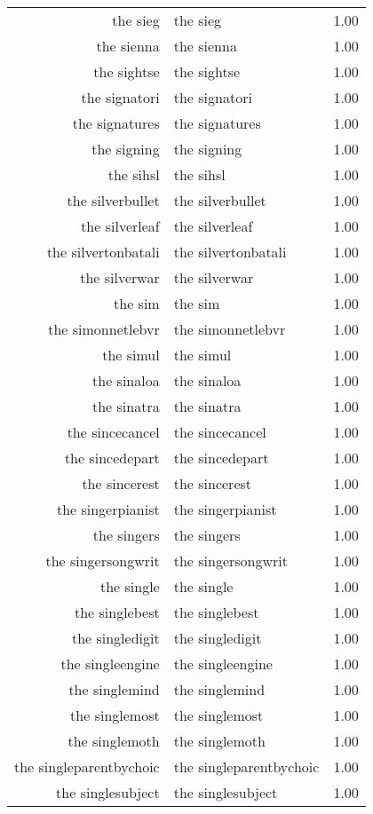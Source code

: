 \begin{table}[ht]
\begin{tabular}{rlr}
  the sieg & the sieg & 1.00 \\ 
  the sienna & the sienna & 1.00 \\ 
  the sightse & the sightse & 1.00 \\ 
  the signatori & the signatori & 1.00 \\ 
  the signatures & the signatures & 1.00 \\ 
  the signing & the signing & 1.00 \\ 
  the sihsl & the sihsl & 1.00 \\ 
  the silverbullet & the silverbullet & 1.00 \\ 
  the silverleaf & the silverleaf & 1.00 \\ 
  the silvertonbatali & the silvertonbatali & 1.00 \\ 
  the silverwar & the silverwar & 1.00 \\ 
  the sim & the sim & 1.00 \\ 
  the simonnetlebvr & the simonnetlebvr & 1.00 \\ 
  the simul & the simul & 1.00 \\ 
  the sinaloa & the sinaloa & 1.00 \\ 
  the sinatra & the sinatra & 1.00 \\ 
  the sincecancel & the sincecancel & 1.00 \\ 
  the sincedepart & the sincedepart & 1.00 \\ 
  the sincerest & the sincerest & 1.00 \\ 
  the singerpianist & the singerpianist & 1.00 \\ 
  the singers & the singers & 1.00 \\ 
  the singersongwrit & the singersongwrit & 1.00 \\ 
  the single & the single & 1.00 \\ 
  the singlebest & the singlebest & 1.00 \\ 
  the singledigit & the singledigit & 1.00 \\ 
  the singleengine & the singleengine & 1.00 \\ 
  the singlemind & the singlemind & 1.00 \\ 
  the singlemost & the singlemost & 1.00 \\ 
  the singlemoth & the singlemoth & 1.00 \\ 
  the singleparentbychoic & the singleparentbychoic & 1.00 \\ 
  the singlesubject & the singlesubject & 1.00 \\ 

\end{tabular}
\end{table}
